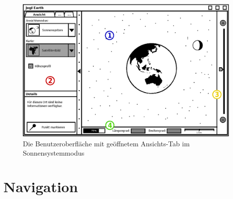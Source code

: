\documentclass[10pt]{scrreprt}
\begin{document}
\vspace{1cm}
\begin{figure}[!htb]
	\centering
	\includegraphics[scale=0.9]{GUI-Sonnensystem.eps}
	\caption{Die Benutzeroberfläche mit geöffnetem Ansichts-Tab im Sonnensystemmodus}
\end{figure}

\newpage
\section{Navigation}

\vspace{3mm}
\end{document}
